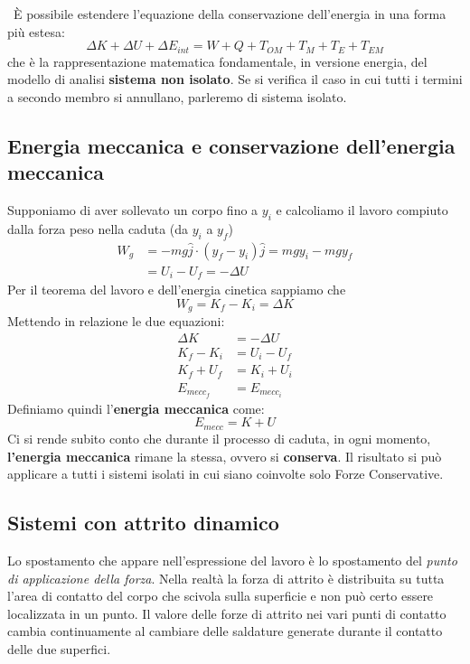 \documentclass[a4paper,11pt,oneside]{book}
\begin{document}
~\newline È possibile estendere l'equazione della conservazione dell'energia in una forma più estesa:
\begin{equation*}
    \Delta K + \Delta U + \Delta E_{int} = W + Q + T_{OM} + T_{M} + T_{E}+ T_{EM}
\end{equation*}
che è la rappresentazione matematica fondamentale, in versione energia, del modello di analisi \textbf{sistema non isolato}.
Se si verifica il caso in cui tutti i termini a secondo membro si annullano, parleremo di sistema isolato.  

\subsection{Energia meccanica e conservazione dell'energia meccanica}
Supponiamo di aver sollevato un corpo fino a $y_i$ e calcoliamo il lavoro compiuto dalla forza peso nella caduta (da $y_i$ a $y_f$)
\begin{align*}
    W_g &= -mg\hat{j} \cdot (y_f - y_i) \hat{j} = mgy_i - mgy_f \\ &=U_i - U_f = -\Delta U
\end{align*}
Per il teorema del lavoro e dell'energia cinetica sappiamo che 
\begin{equation*}
    W_g = K_f - K_i = \Delta K
\end{equation*}
Mettendo in relazione le due equazioni:
\begin{align*}
    \Delta K &= -\Delta U \\
    K_f - K_i &= U_i - U_f \\
    K_f + U_f &= K_i + U_i \\
    E_{mecc_f} &= E_{mecc_i}
\end{align*}
Definiamo quindi l'\textbf{energia meccanica} come:
\begin{equation*}
    E_{mecc} = K + U
\end{equation*}
Ci si rende subito conto che durante il processo di caduta, in ogni momento, \textbf{l'energia meccanica} rimane la stessa, ovvero si \textbf{conserva}.
Il risultato si può applicare a tutti i sistemi isolati in cui siano coinvolte solo Forze Conservative.

\subsection{Sistemi con attrito dinamico}
Lo spostamento che appare nell’espressione del lavoro è lo spostamento del \emph{punto di applicazione della forza}.
Nella realtà la forza di attrito è distribuita su tutta l’area di contatto del corpo che scivola sulla superficie e non può certo essere localizzata in un punto.
Il valore delle forze di attrito nei vari punti di contatto cambia continuamente al cambiare delle saldature generate durante il contatto delle due superfici. 
\end{document}
